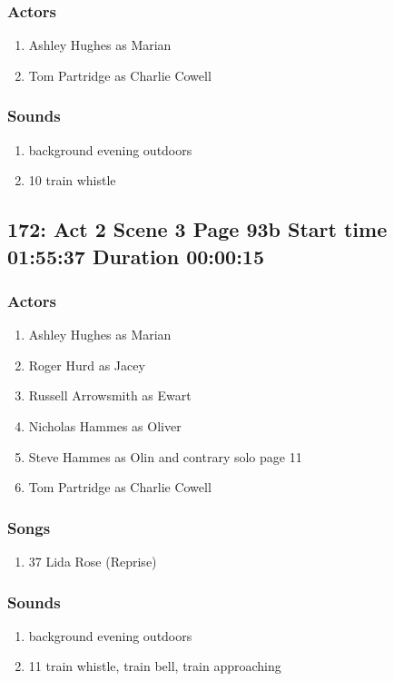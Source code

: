 \subsubsection{Actors}
\begin{enumerate}
\item Ashley Hughes as Marian
\item Tom Partridge as Charlie Cowell
\end{enumerate}

\subsubsection{Sounds}
\begin{enumerate}
\item background evening outdoors
\item 10 train whistle
\end{enumerate}
\subsection{172: Act 2 Scene 3 Page 93b Start time 01:55:37 Duration 00:00:15}

\subsubsection{Actors}
\begin{enumerate}
\item Ashley Hughes as Marian
\item Roger Hurd as Jacey
\item Russell Arrowsmith as Ewart
\item Nicholas Hammes as Oliver
\item Steve Hammes as Olin and contrary solo page 11
\item Tom Partridge as Charlie Cowell
\end{enumerate}

\subsubsection{Songs}
\begin{enumerate}
\item 37 Lida Rose (Reprise)
\end{enumerate}\subsubsection{Sounds}
\begin{enumerate}
\item background evening outdoors
\item 11 train whistle, train bell, train approaching
\end{enumerate}
